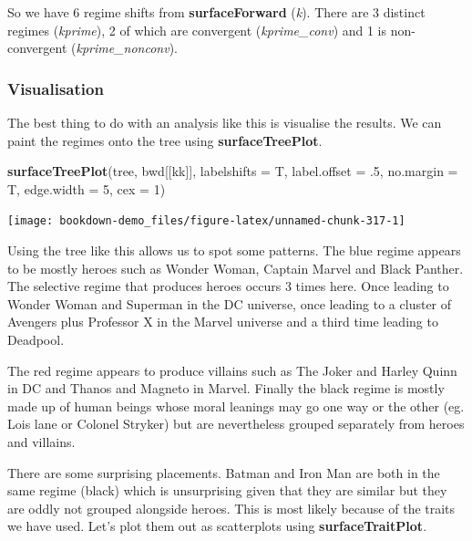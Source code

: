\documentclass[
]{book}
\newenvironment{Shaded}{\begin{snugshade}}{\end{snugshade}}
\newcommand{\DataTypeTok}[1]{\textcolor[rgb]{0.13,0.29,0.53}{#1}}
\newcommand{\DecValTok}[1]{\textcolor[rgb]{0.00,0.00,0.81}{#1}}
\newcommand{\FloatTok}[1]{\textcolor[rgb]{0.00,0.00,0.81}{#1}}
\newcommand{\KeywordTok}[1]{\textcolor[rgb]{0.13,0.29,0.53}{\textbf{#1}}}
\newcommand{\NormalTok}[1]{#1}
\begin{document}
So we have 6 regime shifts from \textbf{surfaceForward} (\emph{k}). There are 3 distinct regimes (\emph{kprime}), 2 of which are convergent (\emph{kprime\_conv}) and 1 is non-convergent (\emph{kprime\_nonconv}).

\hypertarget{visualisation}{%
\subsubsection{Visualisation}\label{visualisation}}

The best thing to do with an analysis like this is visualise the results. We can paint the regimes onto the tree using \textbf{surfaceTreePlot}.

\begin{Shaded}
\begin{Highlighting}[]
\KeywordTok{surfaceTreePlot}\NormalTok{(tree, bwd[[kk]], }\DataTypeTok{labelshifts =}\NormalTok{ T, }\DataTypeTok{label.offset =} \FloatTok{.5}\NormalTok{, }
                \DataTypeTok{no.margin =}\NormalTok{ T, }\DataTypeTok{edge.width =} \DecValTok{5}\NormalTok{, }\DataTypeTok{cex =} \DecValTok{1}\NormalTok{)}
\end{Highlighting}
\end{Shaded}

\begin{center}\texttt{[image: bookdown-demo\_files/figure-latex/unnamed-chunk-317-1]} \end{center}

Using the tree like this allows us to spot some patterns. The blue regime appears to be mostly heroes such as Wonder Woman, Captain Marvel and Black Panther. The selective regime that produces heroes occurs 3 times here. Once leading to Wonder Woman and Superman in the DC universe, once leading to a cluster of Avengers plus Professor X in the Marvel universe and a third time leading to Deadpool.

The red regime appears to produce villains such as The Joker and Harley Quinn in DC and Thanos and Magneto in Marvel. Finally the black regime is mostly made up of human beings whose moral leanings may go one way or the other (eg. Lois lane or Colonel Stryker) but are nevertheless grouped separately from heroes and villains.

There are some surprising placements. Batman and Iron Man are both in the same regime (black) which is unsurprising given that they are similar but they are oddly not grouped alongside heroes. This is most likely because of the traits we have used. Let's plot them out as scatterplots using \textbf{surfaceTraitPlot}.
\end{document}
